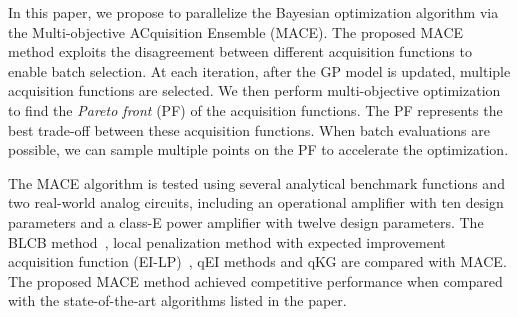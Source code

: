In this paper, we propose to parallelize the Bayesian optimization algorithm
via the Multi-objective ACquisition Ensemble (MACE). The proposed MACE method
exploits the disagreement between different acquisition functions to enable
batch selection. At each iteration, after the GP model is updated, multiple
acquisition functions are selected. We then perform multi-objective
optimization to find the \emph{Pareto front} (PF) of the acquisition functions.
The PF represents the best trade-off between these acquisition functions. When
batch evaluations are possible, we can sample multiple points on the PF to accelerate the optimization.

The MACE algorithm is tested using several analytical benchmark functions and
two real-world analog circuits, including an operational amplifier with ten
design parameters and a class-E power amplifier with twelve design parameters.
The BLCB method~\cite{desautels2014parallelizing}, local penalization method with expected improvement
acquisition function (EI-LP)~\cite{gonzalez2016batch}, qEI \cite{qEI} methods and qKG \cite{wu2016parallel} are compared with
MACE. The proposed MACE method achieved competitive performance when compared
with the state-of-the-art algorithms listed in the paper.
